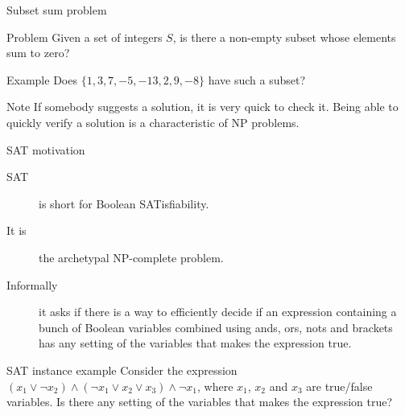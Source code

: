 \begin{frame}{Subset sum problem}
  
  \begin{alertblock}{Problem}
    Given a set of integers $S$, is there a non-empty subset whose elements sum to zero?
  \end{alertblock}

  \vspace{4mm}
  
  \begin{exampleblock}{Example}
    Does $\{ 1, 3, 7, -5, -13, 2, 9, -8 \}$ have such a subset?
  \end{exampleblock}
  
  \vspace{4mm}

  \begin{alertblock}{Note}
     If somebody suggests a solution, it is very quick to check it.
    Being able to quickly verify a solution is a characteristic of NP problems.
  \end{alertblock}
\end{frame}


\begin{frame}{SAT motivation}
  \begin{description}
    \item[SAT] is short for Boolean SATisfiability.
    \item[It is] the archetypal NP-complete problem.
    \item[Informally] it asks if there is a way to efficiently decide if an expression containing a bunch of Boolean variables combined using ands, ors, nots and brackets has any setting of the variables that makes the expression true.
  \end{description}

  \begin{exampleblock}{SAT instance example}
    Consider the expression $(x_1 \lor \neg{x_2}) \land (\neg{x_1} \lor x_2 \lor x_3) \land \neg{x_1}$, where $x_1$, $x_2$ and $x_3$ are true/false variables.
    Is there any setting of the variables that makes the expression true?
  \end{exampleblock}
\end{frame}


